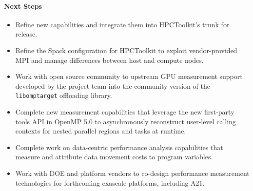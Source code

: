 \paragraph{Next Steps}
\begin{itemize}

\item 
Refine new capabilities and integrate them into HPCToolkit's trunk for
release.

\item 
Refine the Spack configuration for HPCToolkit to exploit
vendor-provided MPI and manage differences between host and compute
nodes.

\item 
Work with open source community to upstream GPU measurement support
developed by the project team into the community version of the {\tt
libomptarget} offloading library.

\item 
Complete new measurement capabilities that leverage the new
first-party tools API in OpenMP 5.0 to asynchronously reconstruct
user-level calling contexts for nested parallel regions and tasks at
runtime.

\item 
Complete work on data-centric performance analysis capabilities that
measure and attribute data movement costs to program variables.

\item 
Work with DOE and platform vendors to co-design performance
measurement technologies for forthcoming exascale platforms, including
A21.

\end{itemize}
